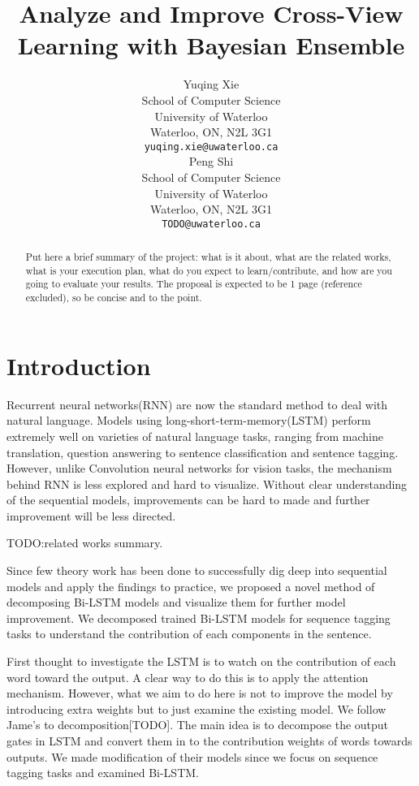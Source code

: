 \documentclass{article}
\title{Analyze and Improve Cross-View Learning with Bayesian Ensemble}
\author{
	Yuqing Xie \\
	School of Computer Science\\
	University of Waterloo\\
	Waterloo, ON, N2L 3G1 \\
	\texttt{yuqing.xie@uwaterloo.ca} \\
	\And
	Peng Shi\\
	School of Computer Science\\
	University of Waterloo\\
	Waterloo, ON, N2L 3G1 \\
	\texttt{TODO@uwaterloo.ca} \\
}
\begin{document}
\maketitle

\begin{abstract}

Put here a brief summary of the project: what is it about, what are the related works, what is your execution plan, what do you expect to learn/contribute, and how are you going to evaluate your results. The proposal is expected to be 1 page (reference excluded), so be concise and to the point. 

\end{abstract}

\section{Introduction}

Recurrent neural networks(RNN) are now the standard method to deal with natural language. Models using long-short-term-memory(LSTM) perform extremely well on varieties of natural language tasks, ranging from machine translation, question answering to sentence classification and sentence tagging. However, unlike Convolution neural networks for vision tasks, the mechanism behind RNN is less explored and hard to visualize. Without clear understanding of the sequential models, improvements can be hard to made and further improvement will be less directed. 

TODO:related works summary.

Since few theory work has been done to successfully dig deep into sequential models and apply the findings to practice, we proposed a novel method of decomposing Bi-LSTM models and visualize them for further model improvement. We decomposed trained Bi-LSTM models for sequence tagging tasks to understand the contribution of each components in the sentence. %

First thought to investigate the LSTM is to watch on the contribution of each word toward the output. A clear way to do this is to apply the attention mechanism. However, what we aim to do here is not to improve the model by introducing extra weights but to just examine the existing model. We follow Jame’s to decomposition[TODO]. The main idea is to decompose the output gates in LSTM and convert them in to the contribution weights of words towards outputs. We made modification of their models since we focus on sequence tagging tasks and examined Bi-LSTM.
\end{document}
